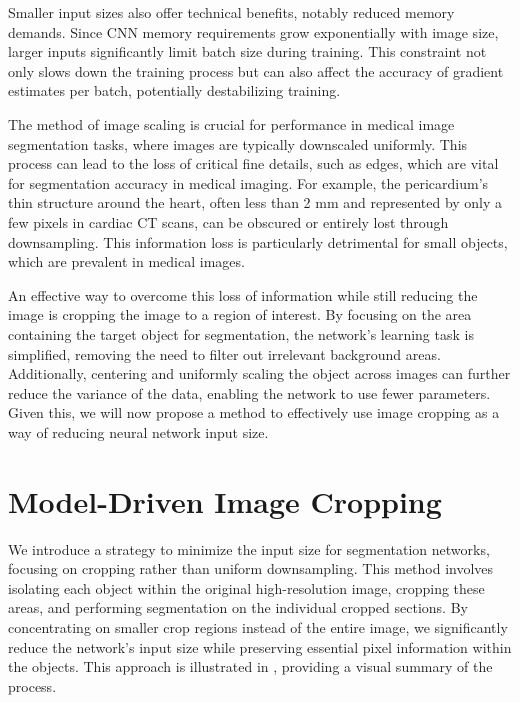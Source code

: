 Smaller input sizes also offer technical benefits, notably reduced memory demands. Since CNN memory requirements grow exponentially with image size, larger inputs significantly limit batch size during training. This constraint not only slows down the training process but can also affect the accuracy of gradient estimates per batch, potentially destabilizing training.

The method of image scaling is crucial for performance in medical image segmentation tasks, where images are typically downscaled uniformly. This process can lead to the loss of critical fine details, such as edges, which are vital for segmentation accuracy in medical imaging. For example, the pericardium's thin structure around the heart, often less than 2 mm and represented by only a few pixels in cardiac CT scans, can be obscured or entirely lost through downsampling. This information loss is particularly detrimental for small objects, which are prevalent in medical images.

An effective way to overcome this loss of information while still reducing the image is cropping the image to a region of interest. By focusing on the area containing the target object for segmentation, the network's learning task is simplified, removing the need to filter out irrelevant background areas. Additionally, centering and uniformly scaling the object across images can further reduce the variance of the data, enabling the network to use fewer parameters. Given this, we will now propose a method to effectively use image cropping as a way of reducing neural network input size.

\section{Model-Driven Image Cropping}

We introduce a strategy to minimize the input size for segmentation networks, focusing on cropping rather than uniform downsampling. This method involves isolating each object within the original high-resolution image, cropping these areas, and performing segmentation on the individual cropped sections. By concentrating on smaller crop regions instead of the entire image, we significantly reduce the network's input size while preserving essential pixel information within the objects. This approach is illustrated in , providing a visual summary of the process.

